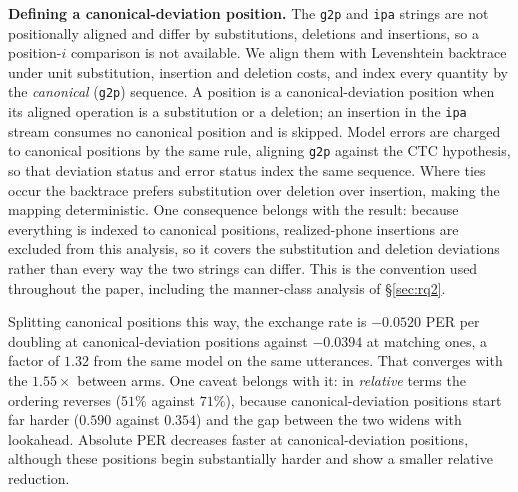 \documentclass[journal]{IEEEtran}
\begin{document}
\textbf{Defining a canonical-deviation position.} The \texttt{g2p} and
\texttt{ipa} strings are not positionally aligned and differ by substitutions,
deletions and insertions, so a position-$i$ comparison is not available. We
align them with Levenshtein backtrace under unit substitution, insertion and
deletion costs, and index every quantity by the \emph{canonical}
(\texttt{g2p}) sequence. A position is a canonical-deviation position when its
aligned operation is a substitution or a deletion; an insertion in the
\texttt{ipa} stream consumes no canonical position and is skipped. Model errors
are charged to canonical positions by the same rule, aligning \texttt{g2p}
against the CTC hypothesis, so that deviation status and error status index the
same sequence. Where ties occur the backtrace prefers substitution over
deletion over insertion, making the mapping deterministic. One consequence
belongs with the result: because everything is indexed to canonical positions,
realized-phone insertions are excluded from this analysis, so it covers the
substitution and deletion deviations rather than every way the two strings can
differ. This is the
convention used throughout the paper, including the manner-class analysis of
\S\ref{sec:rq2}.

Splitting canonical positions this way, the exchange rate is $-0.0520$ PER
per doubling at canonical-deviation positions against $-0.0394$ at matching ones,
a factor of $\mathbf{1.32}$ from the same model on the same utterances. That
converges with the $1.55\times$ between arms. One caveat belongs with it: in
\emph{relative} terms the ordering reverses ($51\%$ against $71\%$), because
canonical-deviation positions start far harder ($0.590$ against $0.354$) and the
gap between the two widens with lookahead. Absolute PER decreases faster at canonical-deviation positions, although these
positions begin substantially harder and show a smaller relative reduction.
\end{document}
